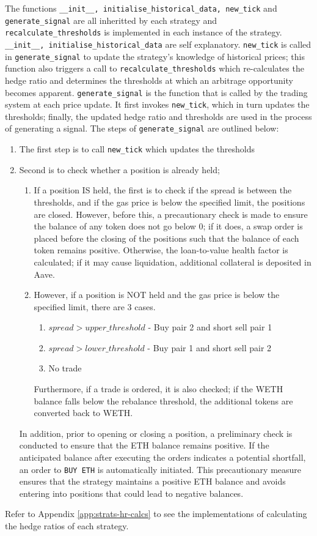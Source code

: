 \noindent The functions \texttt{\_\_init\_\_,\ initialise\_historical\_data,\ new\_tick} and \texttt{generate\_signal} are all inheritted by each strategy and \texttt{recalculate\_thresholds} is implemented in each instance of the strategy. \texttt{\_\_init\_\_,\ initialise\_historical\_data} are self explanatory. \texttt{new\_tick} is called in \texttt{generate\_signal} to update the strategy's knowledge of historical prices; this function also triggers a call to \texttt{recalculate\_thresholds} which re-calculates the hedge ratio and determines the thresholds at which an arbitrage opportunity becomes apparent. \texttt{generate\_signal} is the function that is called by the trading system at each price update. It first invokes \texttt{new\_tick}, which in turn updates the thresholds; finally, the updated hedge ratio and thresholds are used in the process of generating a signal. The steps of \texttt{generate\_signal} are outlined below:
\begin{enumerate}
    \item The first step is to call \texttt{new\_tick} which updates the thresholds
    \item Second is to check whether a position is already held;
    \begin{enumerate}
        \item If a position IS held, the first is to check if the spread is between the thresholds, and if the gas price is below the specified limit, the positions are closed. However, before this, a precautionary check is made to ensure the balance of any token does not go below 0; if it does, a swap order is placed before the closing of the positions such that the balance of each token remains positive. Otherwise, the loan-to-value health factor is calculated; if it may cause liquidation, additional collateral is deposited in Aave.
        \item However, if a position is NOT held and the gas price is below the specified limit, there are 3 cases. \begin{enumerate}
            \item $spread > upper\_threshold$ - Buy pair 2 and short sell pair 1
            \item $spread > lower\_threshold$ - Buy pair 1 and short sell pair 2
            \item No trade
        \end{enumerate}
        Furthermore, if a trade is ordered, it is also checked; if the WETH balance falls below the rebalance threshold, the additional tokens are converted back to WETH.
    \end{enumerate}
    In addition, prior to opening or closing a position, a preliminary check is conducted to ensure that the ETH balance remains positive. If the anticipated balance after executing the orders indicates a potential shortfall, an order to \texttt{BUY\ ETH} is automatically initiated. This precautionary measure ensures that the strategy maintains a positive ETH balance and avoids entering into positions that could lead to negative balances.
\end{enumerate}
Refer to Appendix \ref{app:strats-hr-calcs} to see the implementations of calculating the hedge ratios of each strategy.

